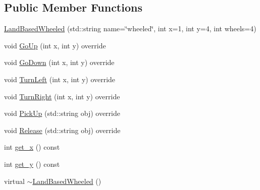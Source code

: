 \subsection*{Public Member Functions}
\begin{DoxyCompactItemize}
\item 
\hyperlink{classrwa3_1_1_land_based_wheeled_a0a8f57819c36e24c6b2320d8088919af}{Land\+Based\+Wheeled} (std\+::string name=\char`\"{}wheeled\char`\"{}, int x=1, int y=4, int wheels=4)
\item 
void \hyperlink{classrwa3_1_1_land_based_wheeled_a5feba1496039c50dd2d2f87fc286f438}{Go\+Up} (int x, int y) override
\item 
void \hyperlink{classrwa3_1_1_land_based_wheeled_a20208be52afe9cdb302f288be3bb7608}{Go\+Down} (int x, int y) override
\item 
void \hyperlink{classrwa3_1_1_land_based_wheeled_a5a659cca86a65e89156ef30ff363de41}{Turn\+Left} (int x, int y) override
\item 
void \hyperlink{classrwa3_1_1_land_based_wheeled_a90d9a8735197a7647f508c1983191590}{Turn\+Right} (int x, int y) override
\item 
void \hyperlink{classrwa3_1_1_land_based_wheeled_aa82a9a72c4452ba203edc4c9ef0ad6c6}{Pick\+Up} (std\+::string obj) override
\item 
void \hyperlink{classrwa3_1_1_land_based_wheeled_af4bd6e50a4a6d30186c969add4d9c954}{Release} (std\+::string obj) override
\item 
int \hyperlink{classrwa3_1_1_land_based_wheeled_a71d85c53a65516d08728284e27107f65}{get\+\_\+x} () const
\item 
int \hyperlink{classrwa3_1_1_land_based_wheeled_ac16ccd003eae45997e00b4eee71bae3f}{get\+\_\+y} () const
\item 
virtual \hyperlink{classrwa3_1_1_land_based_wheeled_a0c46a810956dbe99d0a94db8d238d4d7}{$\sim$\+Land\+Based\+Wheeled} ()
\end{DoxyCompactItemize}
